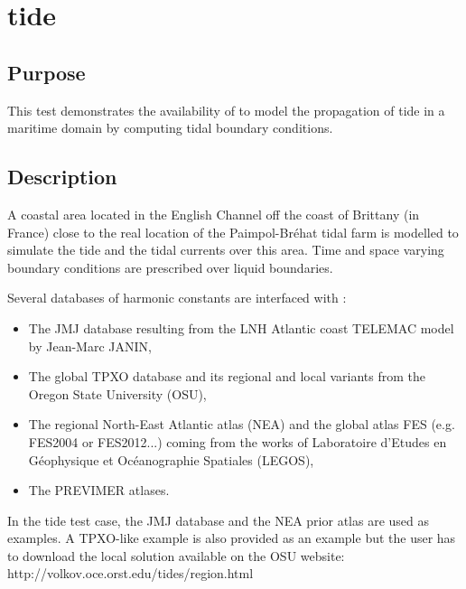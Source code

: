 \chapter{tide}
%
%
\section{Purpose}
%
This test demonstrates the availability of  to model the
propagation of tide in a maritime domain by computing tidal
boundary conditions.
%
\section{Description}
%
A coastal area located in the English Channel off the coast of
Brittany (in France) close to the real location of the Paimpol-Bréhat
tidal farm is modelled to simulate the tide and the tidal currents
over this area.
Time and space varying boundary conditions are prescribed over
liquid boundaries.

Several databases of harmonic constants are interfaced with
:
\begin{itemize}
\item The JMJ database resulting from the LNH Atlantic coast TELEMAC
model by Jean-Marc JANIN,
\item The global TPXO database and its regional and local variants
from the Oregon State University (OSU),
\item The regional North-East Atlantic atlas (NEA) and the global
atlas FES (e.g. FES2004 or FES2012...) coming from the works of
Laboratoire d’Etudes en Géophysique et Océanographie Spatiales (LEGOS),
\item The PREVIMER atlases.
\end{itemize}

In the tide test case, the JMJ database and the NEA prior atlas are
used as examples.
A TPXO-like example is also provided as an example but the user has
to download the local solution available on the OSU website:
http://volkov.oce.orst.edu/tides/region.html
%
%
%
%

